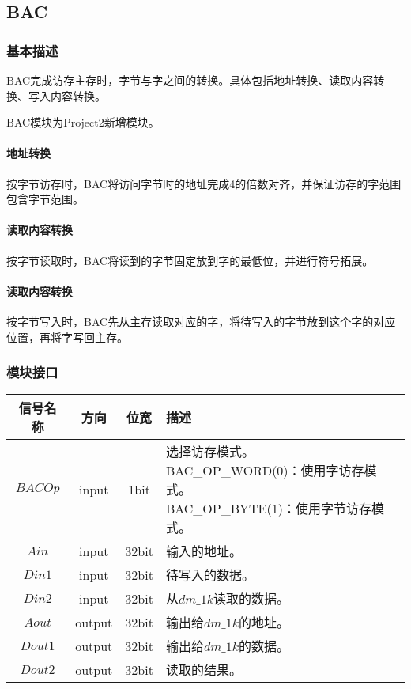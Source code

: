 \documentclass[main.tex]{subfiles}
\begin{document}
\clearpage \subsection{BAC}
\subsubsection{基本描述}
BAC完成访存主存时，字节与字之间的转换。具体包括地址转换、读取内容转换、写入内容转换。

BAC模块为Project2新增模块。

\paragraph{地址转换}
按字节访存时，BAC将访问字节时的地址完成4的倍数对齐，并保证访存的字范围包含字节范围。

\paragraph{读取内容转换}
按字节读取时，BAC将读到的字节固定放到字的最低位，并进行符号拓展。

\paragraph{读取内容转换}
按字节写入时，BAC先从主存读取对应的字，将待写入的字节放到这个字的对应位置，再将字写回主存。


\subsubsection{模块接口}
\begin{center}
    \begin{tabular}[]{c c c l}
        \toprule
        信号名称 & 方向 & 位宽 & 描述 \\
        \midrule
        $BACOp$ & input & 1bit & \makecell[lt]{
            选择访存模式。\\
            BAC\_OP\_WORD(0)：使用字访存模式。\\
            BAC\_OP\_BYTE(1)：使用字节访存模式。\\
        } \\
        \midrule
        $Ain$ & input & 32bit & 输入的地址。 \\
        $Din1$ & input & 32bit & 待写入的数据。 \\
        $Din2$ & input & 32bit & 从$dm\_1k$读取的数据。\\
        $Aout$ & output & 32bit & 输出给$dm\_1k$的地址。\\
        $Dout1$ & output & 32bit & 输出给$dm\_1k$的数据。 \\
        $Dout2$ & output & 32bit & 读取的结果。 \\
        \bottomrule
    \end{tabular}
\end{center}
\end{document}

